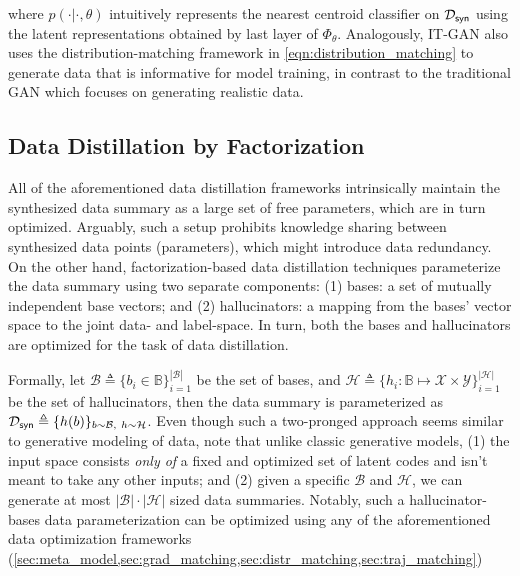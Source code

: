 \documentclass[10pt]{article} %
\begin{document}
where $\hat{p}(\cdot|\cdot, \theta)$ intuitively represents the nearest centroid classifier on $\mathcal{D}_{\mathsf{syn}}$ using the latent representations obtained by last layer of $\Phi_\theta$. Analogously, IT-GAN \citep{gan_distillation} also uses the distribution-matching framework in \cref{eqn:distribution_matching} to generate data that is informative for model training, in contrast to the traditional GAN \citep{gan} which focuses on generating realistic data.

\subsection{Data Distillation by Factorization} \label{sec:dd_factorization}
All of the aforementioned data distillation frameworks intrinsically maintain the synthesized data summary as a large set of free parameters, which are in turn optimized. Arguably, such a setup prohibits knowledge sharing between synthesized data points (parameters), which might introduce data redundancy. On the other hand, factorization-based data distillation techniques parameterize the data summary using two separate components: (1) bases: a set of mutually independent base vectors; and (2) hallucinators: a mapping from the bases' vector space to the joint data- and label-space. In turn, both the bases and hallucinators are optimized for the task of data distillation. 

Formally, let $\mathcal{B} \triangleq \{b_i \in \mathbb{B}\}_{i=1}^{|\mathcal{B}|}$ be the set of bases, and $\mathcal{H} \triangleq \{h_i : \mathbb{B} \mapsto \mathcal{X} \times \mathcal{Y} \}_{i=1}^{|\mathcal{H}|}$ be the set of hallucinators, then the data summary is parameterized as $\mathcal{D}_{\mathsf{syn}} \triangleq \{ {h(b)} \}_{b\sim \mathcal{B}, ~ h\sim \mathcal{H}}$. Even though such a two-pronged approach seems similar to generative modeling of data, note that unlike classic generative models, (1) the input space consists \emph{only of} a fixed and optimized set of latent codes and isn't meant to take any other inputs; and (2) given a specific $\mathcal{B}$ and $\mathcal{H}$, we can generate at most $|\mathcal{B}|\cdot|\mathcal{H}|$ sized data summaries. Notably, such a hallucinator-bases data parameterization can be optimized using any of the aforementioned data optimization frameworks (\cref{sec:meta_model,sec:grad_matching,sec:distr_matching,sec:traj_matching})
\end{document}
